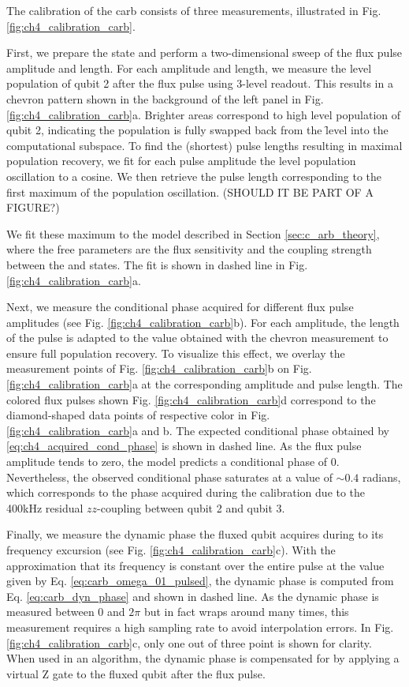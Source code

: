 The calibration of the \gls{carb} consists of three measurements, illustrated in Fig. \ref{fig:ch4_calibration_carb}.

First, we prepare the \oo state and perform a two-dimensional sweep of the flux pulse amplitude and length. For each amplitude and length, we measure the \e level population of qubit 2 after the flux pulse using 3-level readout. This results in a chevron pattern shown in the background of the left panel in Fig. \ref{fig:ch4_calibration_carb}a. Brighter areas correspond to high \e level population of qubit 2, indicating the population is fully swapped back from the \f level into the computational subspace. To find the (shortest) pulse lengths resulting in maximal population recovery, we fit for each pulse amplitude the \e level population oscillation to a cosine. We then retrieve the pulse length corresponding to the first maximum of the population oscillation. (SHOULD IT BE PART OF A FIGURE?)

We fit these maximum to the model described in Section \ref{sec:c_arb_theory}, where the free parameters are the flux sensitivity and the coupling strength between the \oo and \tz states. The fit is shown in dashed line in Fig. \ref{fig:ch4_calibration_carb}a.

Next, we measure the conditional phase acquired for different flux pulse amplitudes (see Fig. \ref{fig:ch4_calibration_carb}b). For each amplitude, the length of the pulse is adapted to the value obtained with the chevron measurement to ensure full population recovery.  
To visualize this effect, we overlay the measurement points of Fig. \ref{fig:ch4_calibration_carb}b on Fig. \ref{fig:ch4_calibration_carb}a at the corresponding amplitude and pulse length. The colored flux pulses shown Fig. \ref{fig:ch4_calibration_carb}d correspond to the diamond-shaped data points of respective color in Fig. \ref{fig:ch4_calibration_carb}a and b. The expected conditional phase obtained by \eqref{eq:ch4_acquired_cond_phase} is shown in dashed line. As the flux pulse amplitude tends to zero, the model predicts a conditional phase of 0. Nevertheless, the observed conditional phase saturates at a value of $\sim 0.4$ radians, which corresponds to the phase acquired during the calibration due to the  400\unit{kHz} residual $zz$-coupling between qubit 2 and qubit 3. 

Finally, we measure the dynamic phase the fluxed qubit acquires during to its frequency excursion (see Fig. \ref{fig:ch4_calibration_carb}c). With the approximation that its frequency is constant over the entire pulse at the value given by Eq. \eqref{eq:carb_omega_01_pulsed}, the dynamic phase is computed from Eq. \eqref{eq:carb_dyn_phase} and shown in dashed line. As the dynamic phase is measured between 0 and $2\pi$ but in fact wraps around many times, this measurement requires a high sampling rate to avoid interpolation errors. In Fig. \ref{fig:ch4_calibration_carb}c, only one out of three point is shown for clarity. When used in an algorithm, the dynamic phase is compensated for by applying a virtual Z gate to the fluxed qubit after the flux pulse. 

